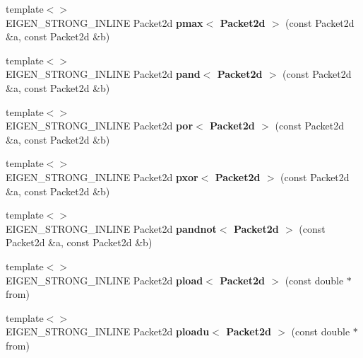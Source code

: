 \begin{DoxyCompactItemize}
{\footnotesize template$<$$>$ }\\E\+I\+G\+E\+N\+\_\+\+S\+T\+R\+O\+N\+G\+\_\+\+I\+N\+L\+I\+NE Packet2d {\bfseries pmax$<$ Packet2d $>$} (const Packet2d \&a, const Packet2d \&b)
\item 
\mbox{\label{namespace_eigen_1_1internal_a2f485a60994bad5dd0593292d0f89c19}} 
{\footnotesize template$<$$>$ }\\E\+I\+G\+E\+N\+\_\+\+S\+T\+R\+O\+N\+G\+\_\+\+I\+N\+L\+I\+NE Packet2d {\bfseries pand$<$ Packet2d $>$} (const Packet2d \&a, const Packet2d \&b)
\item 
\mbox{\label{namespace_eigen_1_1internal_a4678ee0e598312caa5e7c62eee38b832}} 
{\footnotesize template$<$$>$ }\\E\+I\+G\+E\+N\+\_\+\+S\+T\+R\+O\+N\+G\+\_\+\+I\+N\+L\+I\+NE Packet2d {\bfseries por$<$ Packet2d $>$} (const Packet2d \&a, const Packet2d \&b)
\item 
\mbox{\label{namespace_eigen_1_1internal_a446e376a6b2d96f743deec927cfc934b}} 
{\footnotesize template$<$$>$ }\\E\+I\+G\+E\+N\+\_\+\+S\+T\+R\+O\+N\+G\+\_\+\+I\+N\+L\+I\+NE Packet2d {\bfseries pxor$<$ Packet2d $>$} (const Packet2d \&a, const Packet2d \&b)
\item 
\mbox{\label{namespace_eigen_1_1internal_a13e7cbe45ea9a179e16b7a8c1e2ea2dd}} 
{\footnotesize template$<$$>$ }\\E\+I\+G\+E\+N\+\_\+\+S\+T\+R\+O\+N\+G\+\_\+\+I\+N\+L\+I\+NE Packet2d {\bfseries pandnot$<$ Packet2d $>$} (const Packet2d \&a, const Packet2d \&b)
\item 
\mbox{\label{namespace_eigen_1_1internal_a7b7d0a2fe1cb5ad90c8a7c8b61c5671a}} 
{\footnotesize template$<$$>$ }\\E\+I\+G\+E\+N\+\_\+\+S\+T\+R\+O\+N\+G\+\_\+\+I\+N\+L\+I\+NE Packet2d {\bfseries pload$<$ Packet2d $>$} (const double $\ast$from)
\item 
\mbox{\label{namespace_eigen_1_1internal_aad2aa0e94b436c07af15649aa08c5b10}} 
{\footnotesize template$<$$>$ }\\E\+I\+G\+E\+N\+\_\+\+S\+T\+R\+O\+N\+G\+\_\+\+I\+N\+L\+I\+NE Packet2d {\bfseries ploadu$<$ Packet2d $>$} (const double $\ast$from)

\end{DoxyCompactItemize}
